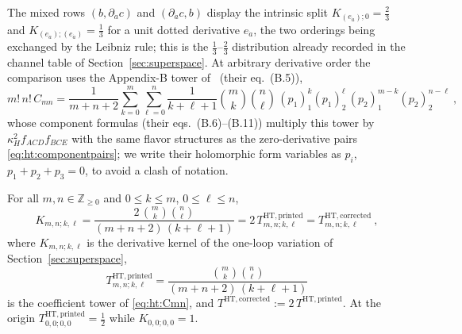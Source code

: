 The mixed rows $(b,\partial_{\dot a}c)$ and $(\partial_{\dot a}c,b)$ display
the intrinsic split $K_{(e_{\dot a});0}=\tfrac23$ and
$K_{(e_{\dot a});(e_{\dot a})}=\tfrac13$ for a unit dotted derivative
$e_{\dot a}$, the two orderings being exchanged by the Leibniz rule; this is
the $\tfrac13$--$\tfrac23$ distribution already recorded in the channel table
of Section~\ref{sec:superspace}. At arbitrary derivative order the comparison
uses the Appendix-B tower of~\cite{BK} (their eq.~(B.5)),
\begin{equation}\label{eq:ht:Cmn}
m!\,n!\,C_{mn}
=\frac{1}{m+n+2}\sum_{k=0}^{m}\sum_{\ell=0}^{n}
\frac{1}{k+\ell+1}\binom{m}{k}\binom{n}{\ell}\,
(p_{1})_{1}^{k}(p_{1})_{2}^{\ell}\,
(p_{2})_{1}^{m-k}(p_{2})_{2}^{n-\ell} \ ,
\end{equation}
whose component formulas (their eqs.~(B.6)--(B.11)) multiply this tower by
$\kappa_{H}^{2}f_{ACD}f_{BCE}$ with the same flavor structures as the
zero-derivative pairs \eqref{eq:ht:componentpairs}; we write their holomorphic
form variables as $p_{i}$, $p_{1}+p_{2}+p_{3}=0$, to avoid a clash of
notation.

\begin{proposition}\label{thm:ht:kernel}
For all $m,n\in\mathbb Z_{\ge0}$ and $0\le k\le m$, $0\le\ell\le n$,
\begin{equation}\label{eq:ht:kernel}
K_{m,n;k,\ell}
=\frac{2\,\binom{m}{k}\binom{n}{\ell}}{(m+n+2)\,(k+\ell+1)}
=2\,T^{\mathrm{HT,printed}}_{m,n;k,\ell}
=T^{\mathrm{HT,corrected}}_{m,n;k,\ell} \ ,
\end{equation}
where $K_{m,n;k,\ell}$ is the derivative kernel of the one-loop variation of
Section~\ref{sec:superspace},
\begin{equation}\label{eq:ht:Tprinted}
T^{\mathrm{HT,printed}}_{m,n;k,\ell}
=\frac{\binom{m}{k}\binom{n}{\ell}}{(m+n+2)\,(k+\ell+1)}
\end{equation}
is the coefficient tower of \eqref{eq:ht:Cmn}, and
$T^{\mathrm{HT,corrected}}:=2\,T^{\mathrm{HT,printed}}$. At the origin
$T^{\mathrm{HT,printed}}_{0,0;0,0}=\tfrac12$ while $K_{0,0;0,0}=1$.
\end{proposition}

